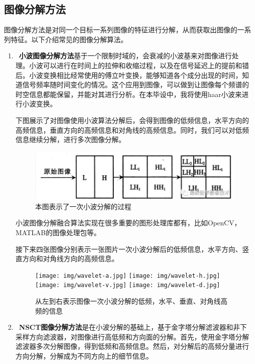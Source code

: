 \documentclass{xduugthesis}
\begin{document}
\subsection{图像分解方法}
图像分解方法是对同一个目标一系列图像的特征进行分解，从而获取出图像的一系列特征。以下介绍常见的图像分解算法。\par
\begin{enumerate}
\item \textbf{小波图像分解方法}\cite{Wavelet_Merge}基于一个限制时域的，会衰减的小波基来对图像进行处理。小波可以进行在时间上的拉伸和收缩过程，以及在信号延迟上的提前和错后。小波变换相比经常使用的傅立叶变换，能够知道各个成分出现的时间，知道信号频率随时间变化的情况。这个应用到图像，可以做到让图像每个频谱的时空信息都能保留，并能对其进行分析。在本毕设中，我将使用haar小波来进行小波变换。\par
下图展示了对图像使用小波算法分解后，会得到图像的低频信息，水平方向的高频信息，垂直方向的高频信息和对角线的高频信息。同时，我们可以对低频信息继续分解，进行多次图像分解。\par
\begin{figure}[h!]
	\centering
	\includegraphics[scale=0.2]{img/wavelet.png}
	\caption{本图表示了一次小波分解的过程}
\end{figure}
小波图像分解融合算法实现在很多重要的图形处理库都有，比如OpenCV，MATLAB的图像处理包等。\par
接下来四张图像分别表示一张图片一次小波分解后的低频信息，水平方向、竖直方向和对角线方向的高频信息。\par
\begin{figure}[h!]
	\centering
	\texttt{[image: img/wavelet-a.jpg]}
	\texttt{[image: img/wavelet-h.jpg]}
	\texttt{[image: img/wavelet-v.jpg]}
	\texttt{[image: img/wavelet-d.jpg]}
	\caption{从左到右表示图像一次小波分解的低频，水平、垂直、对角线高频的信息}
\end{figure}
\item \textbf{NSCT图像分解方法}\cite{NSCT_Merge}是在小波分解的基础上，基于金字塔分解滤波器和非下采样方向滤波器，对图像进行高低频和方向面的分解。首先，使用金字塔分解滤波器多次分解图像，得到低频和高频信息。然后，对分解后的高频分量进行方向分解，分解成为不同方向上的细节信息。\par

\end{enumerate}
\end{document}
